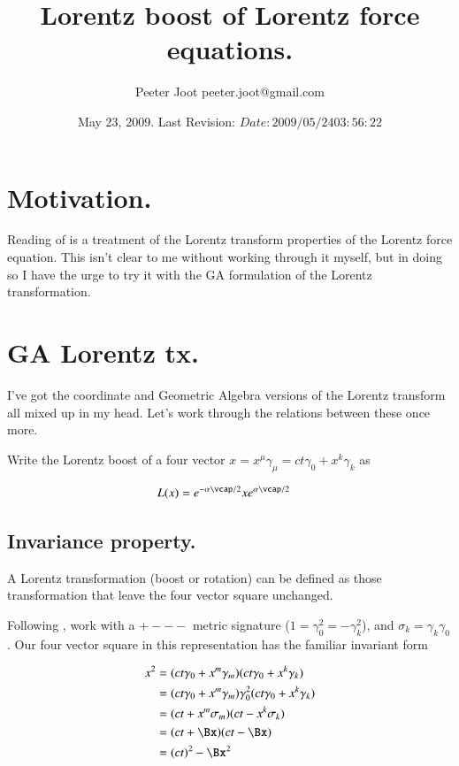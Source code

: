 \documentclass{article}
\title{ Lorentz boost of Lorentz force equations. }
\author{Peeter Joot \quad peeter.joot@gmail.com }
\date{ May 23, 2009.  Last Revision: $Date: 2009/05/24 03:56:22 $ }
\begin{document}
\maketitle{}
\tableofcontents
\section{ Motivation. }

Reading of \cite{bohm1996str} is a treatment of the Lorentz transform
properties of the Lorentz force equation.  This isn't clear to me
without working through it myself, but in doing so I have the urge to
try it with the GA formulation of the Lorentz transformation.

\section{ GA Lorentz tx. }

I've got the coordinate and Geometric Algebra versions of the Lorentz
transform all mixed up in my head.  Let's work through the relations 
between these once more.

Write the Lorentz boost of a four vector $x = x^\mu \gamma_\mu = ct \gamma_0 + x^k \gamma_k$ as

\begin{align}\label{eqn:LorentzBoost}
L(x) &= 
e^{-\alpha \vcap/2}
x
e^{\alpha \vcap/2}
\end{align}

\subsection{ Invariance property. }

A Lorentz transformation (boost or rotation) can be defined as those transformation that leave the four vector square unchanged.

Following \cite{doran2003gap}, work with a $+---$ metric signature ($1 = \gamma_0^2 = -\gamma_k^2$), and $\sigma_k = \gamma_k \gamma_0$.  Our four vector square in this representation has the familiar invariant form

\begin{align*}
x^2 
&= (ct \gamma_0 + x^m \gamma_m) (ct \gamma_0 + x^k \gamma_k) \\
&= (ct \gamma_0 + x^m \gamma_m) \gamma_0^2 (ct \gamma_0 + x^k \gamma_k) \\
&= (ct + x^m \sigma_m) (ct - x^k \sigma_k) \\
&= (ct + \Bx) (ct - \Bx) \\
&= (ct)^2 - \Bx^2
\end{align*}
\end{document}
